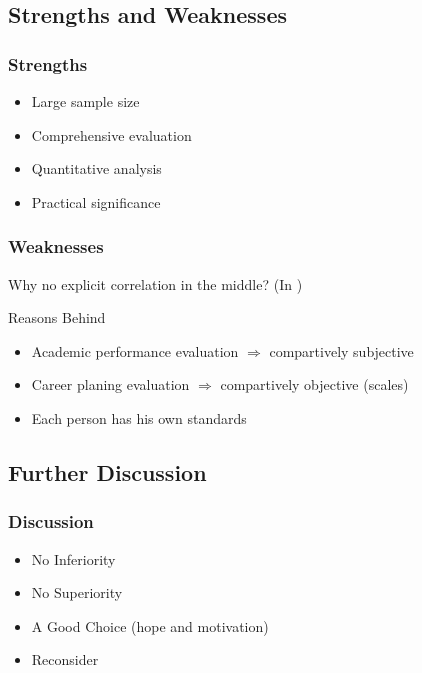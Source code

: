 \subsection{Strengths and Weaknesses}

\begin{frame}
    \frametitle{Strengths}
    \Large
    \begin{itemize}[<+->]
        \item Large sample size
        \item Comprehensive evaluation
        \item Quantitative analysis
        \item Practical significance
    \end{itemize}
\end{frame}

\begin{frame}
    \frametitle{Weaknesses}
    \Large
    Why no explicit correlation in the middle? (In )
    \begin{block}{Reasons Behind}
        \begin{itemize}[<+->]
            \item Academic performance evaluation $\Rightarrow$ compartively subjective
            \item Career planing evaluation $\Rightarrow$ compartively objective (scales)
            \item Each person has his own standards
        \end{itemize}
    \end{block}
\end{frame}

\subsection{Further Discussion}
\begin{frame}
    \frametitle{Discussion}
    \LARGE
    \begin{itemize}[<+->]
        \item No Inferiority
        \item No Superiority
        \item A Good Choice (hope and motivation)
        \item Reconsider
    \end{itemize}
\end{frame}